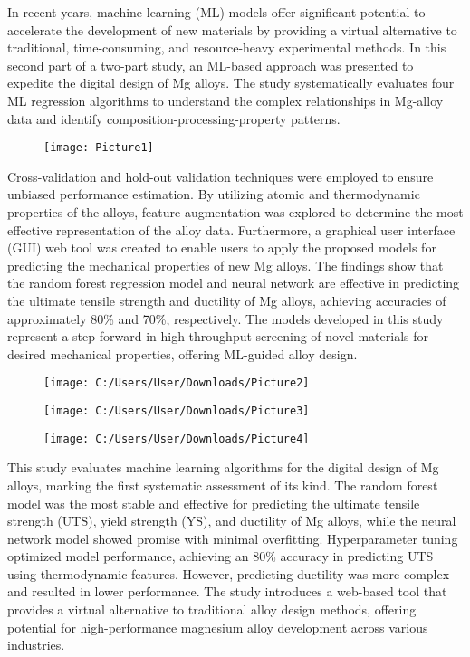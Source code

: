 \documentclass[12pt]{article}
\begin{document}
In recent years, machine learning (ML) models offer significant potential to accelerate the development of new materials by providing a virtual alternative to traditional, time-consuming, and resource-heavy experimental methods. In this second part of a two-part study, an ML-based approach was presented to expedite the digital design of Mg alloys. The study systematically evaluates four ML regression algorithms to understand the complex relationships in Mg-alloy data and identify composition-processing-property patterns.\\
\begin{figure}[h!]
    \centering
    \texttt{[image: Picture1]}
\end{figure}

Cross-validation and hold-out validation techniques were employed to ensure unbiased performance estimation. By utilizing atomic and thermodynamic properties of the alloys, feature augmentation was explored to determine the most effective representation of the alloy data. Furthermore, a graphical user interface (GUI) web tool was created to enable users to apply the proposed models for predicting the mechanical properties of new Mg alloys. The findings show that the random forest regression model and neural network are effective in predicting the ultimate tensile strength and ductility of Mg alloys, achieving accuracies of approximately 80\% and 70\%, respectively. The models developed in this study represent a step forward in high-throughput screening of novel materials for desired mechanical properties, offering ML-guided alloy design.\\
\begin{figure}[h!]
	\centering
	\texttt{[image: C:/Users/User/Downloads/Picture2]}
\end{figure}
\begin{figure}[h!]
	\centering
	\texttt{[image: C:/Users/User/Downloads/Picture3]}
\end{figure}
\begin{figure}[h!]
	\centering
	\texttt{[image: C:/Users/User/Downloads/Picture4]}
\end{figure}

This study evaluates machine learning algorithms for the digital design of Mg alloys, marking the first systematic assessment of its kind. The random forest model was the most stable and effective for predicting the ultimate tensile strength (UTS), yield strength (YS), and ductility of Mg alloys, while the neural network model showed promise with minimal overfitting. Hyperparameter tuning optimized model performance, achieving an 80\% accuracy in predicting UTS using thermodynamic features. However, predicting ductility was more complex and resulted in lower performance. The study introduces a web-based tool that provides a virtual alternative to traditional alloy design methods, offering potential for high-performance magnesium alloy development across various industries.\\
\end{document}
